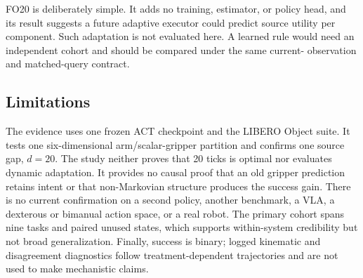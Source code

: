 FO20 is deliberately simple. It adds no training, estimator, or policy head,
and its result suggests a future adaptive executor could predict source utility
per component. Such adaptation is not evaluated here. A learned rule would
need an independent cohort and should be compared under the same current-
observation and matched-query contract.

\subsection{Limitations}

The evidence uses one frozen ACT checkpoint and the LIBERO Object suite. It
tests one six-dimensional arm/scalar-gripper partition and confirms one source
gap, $d=20$. The study neither proves that 20 ticks is optimal nor evaluates
dynamic adaptation. It provides no causal proof that an old gripper prediction
retains intent or that non-Markovian structure produces the success gain.
There is no current confirmation on a second policy, another benchmark, a VLA,
a dexterous or bimanual action space, or a real robot. The primary cohort spans
nine tasks and paired unused states, which supports within-system credibility
but not broad generalization. Finally, success is binary; logged kinematic and
disagreement diagnostics follow treatment-dependent trajectories and are not
used to make mechanistic claims.

